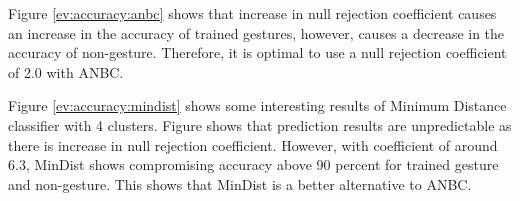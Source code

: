 Figure \ref{ev:accuracy:anbc} shows that increase in null rejection coefficient causes an increase in the accuracy of trained gestures, however, causes a decrease in the accuracy of non-gesture. Therefore, it is optimal to use a null rejection coefficient of 2.0 with ANBC.

Figure \ref{ev:accuracy:mindist} shows some interesting results of Minimum Distance classifier with 4 clusters. Figure shows that prediction results are unpredictable as there is increase in null rejection coefficient. However, with coefficient of around 6.3, MinDist shows compromising accuracy above 90 percent for trained gesture and non-gesture. This shows that MinDist is a better alternative to ANBC. 

\clearpage

 
 


